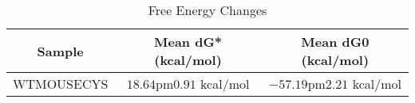 \documentclass{article}
\begin{document}
\begin{table}[ht]
    \centering
    \begin{tabular}{|c|c|c|}
    \hline
    Sample & Mean dG* (kcal/mol) & Mean dG0 (kcal/mol) \\
    \hline
    WTMOUSECYS & $18.64  $pm$  0.91$ kcal/mol & $-57.19  $pm$  2.21$ kcal/mol \\
    \hline
    \end{tabular}
    \caption{Free Energy Changes}
\end{table}
\end{document}
